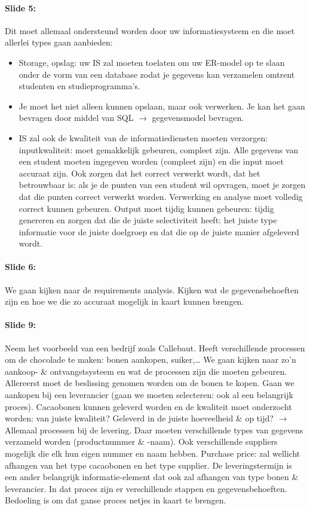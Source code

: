 \documentclass[10pt,a4paper]{report}
\begin{document}
\paragraph{Slide 5:}Dit moet allemaal ondersteund worden door uw informatiesysteem en die moet allerlei types gaan aanbieden:
\begin{itemize}
\item Storage, opslag: uw IS zal moeten toelaten om uw ER-model op te slaan onder de vorm van een database zodat je gegevens kan verzamelen omtrent studenten en studieprogramma's.
\item Je moet het niet alleen kunnen opslaan, maar ook verwerken. Je kan het gaan bevragen door middel van SQL $\rightarrow$ gegevensmodel bevragen.
\item IS zal ook de kwaliteit van de informatiediensten moeten verzorgen: inputkwaliteit: moet gemakkelijk gebeuren, compleet zijn. Alle gegevens van een student moeten ingegeven worden (compleet zijn) en die input moet accuraat zijn. Ook zorgen dat het correct verwerkt wordt, dat het betrouwbaar is: als je de punten van een student wil opvragen, moet je zorgen dat die punten correct verwerkt worden. Verwerking en analyse moet volledig correct kunnen gebeuren. Output moet tijdig kunnen gebeuren: tijdig genereren en zorgen dat die de juiste selectiviteit heeft: het juiste type informatie voor de juiste doelgroep en dat die op de juiste manier afgeleverd wordt.
\end{itemize}

\paragraph{Slide 6:}We gaan kijken naar de requirements analysis. Kijken wat de gegevensbehoeften zijn en hoe we die zo accuraat mogelijk in kaart kunnen brengen.

\paragraph{Slide 9:}Neem het voorbeeld van een bedrijf zoals Callebaut. Heeft verschillende processen om de chocolade te maken: bonen aankopen, suiker,… We gaan kijken naar zo'n aankoop- \& ontvangstsysteem en wat de processen zijn die moeten gebeuren. Allereerst moet de beslissing genomen worden om de bonen te kopen. Gaan we aankopen bij een leverancier (gaan we moeten selecteren: ook al een belangrijk proces). Cacaobonen kunnen geleverd worden en de kwaliteit moet onderzocht worden: van juiste kwaliteit? Geleverd in de juiste hoeveelheid \& op tijd? $\rightarrow$ Allemaal processen bij de levering. Daar moeten verschillende types van gegevens verzameld worden (productnummer \& -naam). Ook verschillende suppliers mogelijk die elk hun eigen nummer en naam hebben. Purchase price: zal wellicht afhangen van het type cacaobonen en het type supplier. De leveringstermijn is een ander belangrijk informatie-element dat ook zal afhangen van type bonen \& leverancier.
In dat proces zijn er verschillende stappen en gegevensbehoeften. Bedoeling is om dat ganse proces netjes in kaart te brengen.
\end{document}
